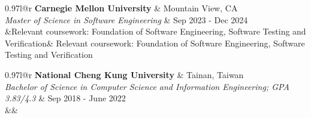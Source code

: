 \newcommand{\resumeEduEntry}[5]{
  \vspace{5pt}\item
    \begin{tabular*}{0.97\textwidth}{l@{\extracolsep{\fill}}r}
      \textbf{#1} & \small #2 \\
      \textit{#3} & \small #4 \\
      \ifx&#5&%
      \else \textbullet #5 \\ \fi
    \end{tabular*}\vspace{-5pt}
}

\resumeEduEntry 
{Carnegie Mellon University}
{Mountain View, CA}
{Master of Science in Software Engineering}
{Sep 2023 - Dec 2024}
{Relevant coursework: Foundation of Software Engineering, Software Testing and Verification}

\resumeEduEntry
{National Cheng Kung University}
{Tainan, Taiwan}
{Bachelor of Science in Computer Science and Information Engineering; GPA 3.83/4.3}
{Sep 2018 - June 2022}
{}
